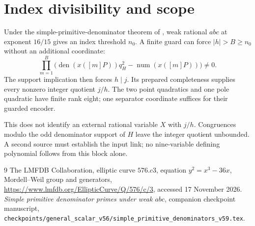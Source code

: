 \documentclass[11pt]{article}
\begin{document}
\section{Index divisibility and scope}

Under the simple-primitive-denominator theorem of \cite{Primitive},
weak rational $abc$ at exponent $16/15$ gives an index threshold
$n_0$. A finite guard can force $|h|>B\ge n_0$ without an additional
coordinate:
\[
 \prod_{m=1}^{B}\bigl(\operatorname{den}(x([m]P))q_H^2
                    -\operatorname{num}(x([m]P))\bigr)\ne0.
\]
The support implication then forces $h\mid j$. Its prepared
completeness supplies every nonzero integer quotient $j/h$.
The two point quadratics and one pole quadratic have finite rank
eight; one separator coordinate suffices for their guarded encoder.

This does not identify an external rational variable $X$ with $j/h$.
Congruences modulo the odd denominator support of $H$ leave the integer
quotient unbounded. A second source must establish the input link;
no nine-variable defining polynomial follows from this block alone.

\begin{thebibliography}{9}
The LMFDB Collaboration, elliptic curve $576.c3$,
equation $y^2=x^3-36x$, Mordell--Weil group and generators,
\url{https://www.lmfdb.org/EllipticCurve/Q/576/c/3}, accessed
17 November 2026.
\emph{Simple primitive denominator primes under
weak $abc$}, companion checkpoint manuscript,
\nolinkurl{checkpoints/general_scalar_v56/simple_primitive_denominators_v59.tex}.
\end{thebibliography}
\end{document}
